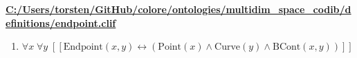 \documentclass{article}
\begin{document}
\textbf{\url{C:/Users/torsten/GitHub/colore/ontologies/multidim\_space\_codib/definitions/endpoint.clif}}

\begin{enumerate}
\item $\forall x\; \forall y\;  \left[ \left[ \textrm{Endpoint}(x,y) \leftrightarrow \left(\textrm{Point}(x) \land \textrm{Curve}(y) \land \textrm{BCont}(x,y)\right) \right] \right]$
\end{enumerate}
\end{document}
